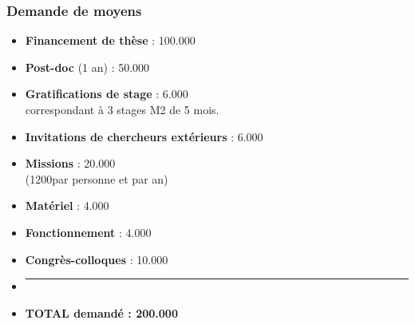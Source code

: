\documentclass[a4paper,compress]{beamer}  %
\theoremstyle{definition}
\begin{document}
\begin{frame}
  \frametitle{Demande de moyens}
\begin{itemize}
\item[] {\bf Financement de thèse} : \hfill 100.000 \EUR\\
\item[] {\bf Post-doc} (1 an) : \hfill 50.000 \EUR\\
\item[] {\bf Gratifications de stage} : \hfill 6.000 \EUR\\
{\footnotesize correspondant à 3 stages M2 de 5 mois.}
\item[] {\bf Invitations de chercheurs extérieurs} : \hfill 6.000 \EUR\\
\item[] {\bf Missions} : \hfill 20.000 \EUR\\
{\footnotesize (1200\EUR par personne et par an)}
\item[] {\bf Matériel} : \hfill 4.000 \EUR
\item[] {\bf Fonctionnement} : \hfill 4.000 \EUR
\item[] {\bf Congrès-colloques} : \hfill 10.000 \EUR
\item[] \rule[-0.1cm]{\linewidth}{0.01cm} 
\item[] {\bf TOTAL demandé : \hfill 200.000 \EUR}
\end{itemize}
\end{frame}
\end{document}
